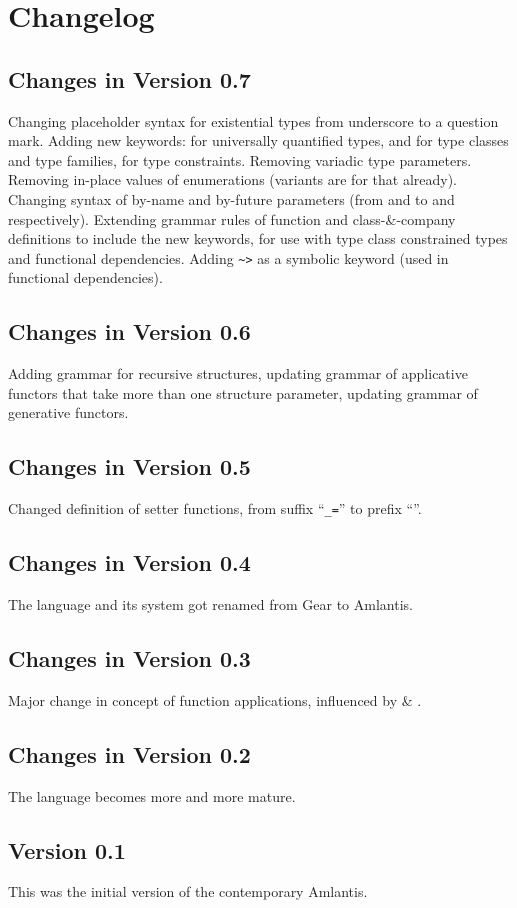 
\chapter{Changelog}
\label{sec:changelog}

\section*{Changes in Version 0.7}

Changing placeholder syntax for existential types from underscore to a question mark. Adding new keywords:  for universally quantified types,  and  for type classes and type families,  for type constraints. Removing variadic type parameters. Removing in-place values of enumerations (variants are for that already). Changing syntax of by-name and by-future parameters (from \code{=>} and \code{=>>} to \code{->} and \code{->>} respectively). Extending grammar rules of function and class-\&-company definitions to include the new keywords, for use with type class constrained types and functional dependencies. Adding \lstinline!~>! as a symbolic keyword (used in functional dependencies). 

\section*{Changes in Version 0.6}

Adding grammar for recursive structures, updating grammar of applicative functors that take more than one structure parameter, updating grammar of generative functors.  

\section*{Changes in Version 0.5}

Changed definition of setter functions, from suffix ``\lstinline!_=!'' to prefix ``''. 

\section*{Changes in Version 0.4}

The language and its system got renamed from Gear to Amlantis. 

\section*{Changes in Version 0.3}

Major change in concept of function applications, influenced by  \& . 

\section*{Changes in Version 0.2}

The language becomes more and more mature.

\section*{Version 0.1}

This was the initial version of the contemporary Amlantis. 
